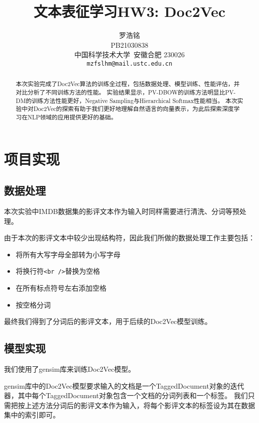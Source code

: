 \documentclass{article}
\title{文本表征学习HW3: Doc2Vec}
\author{
  罗浩铭 \\
  PB21030838\\
  中国科学技术大学\ 安徽合肥 230026 \\
  \texttt{mzfslhm@mail.ustc.edu.cn} \\
}
\begin{document}
\maketitle


\begin{abstract}
  本次实验完成了Doc2Vec算法的训练全过程，包括数据处理、模型训练、性能评估，并对比分析了不同训练方法的性能。
  实验结果显示，PV-DBOW的训练方法明显比PV-DM的训练方法性能更好，Negative Sampling与Hierarchical Softmax性能相当。
  本次实验中对Doc2Vec的探索有助于我们更好地理解自然语言的向量表示，为此后探索深度学习在NLP领域的应用提供更好的基础。
\end{abstract}


\section{项目实现}
\subsection{数据处理}
本次实验中IMDB数据集的影评文本作为输入时同样需要进行清洗、分词等预处理。

由于本次的影评文本中较少出现结构符，因此我们所做的数据处理工作主要包括：
\begin{itemize}
  \item 将所有大写字母全部转为小写字母
  \item 将换行符\verb|<br />|替换为空格
  \item 在所有标点符号左右添加空格
  \item 按空格分词
\end{itemize}

最终我们得到了分词后的影评文本，用于后续的Doc2Vec模型训练。


\subsection{模型实现}
我们使用了gensim库来训练Doc2Vec模型。

gensim库中的Doc2Vec模型要求输入的文档是一个TaggedDocument对象的迭代器，其中每个TaggedDocument对象包含一个文档的分词列表和一个标签。
我们只需把按上述方法分词后的影评文本作为输入，将每个影评文本的标签设为其在数据集中的索引即可。
\end{document}
